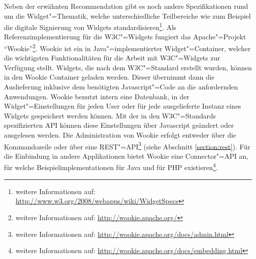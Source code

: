 Neben der erwähnten Recommendation gibt es noch andere Spezifikationen rund um die Widget"=Thematik, welche unterschiedliche Teilbereiche wie zum Beispiel die digitale Signierung von Widgets standardisieren\footnote{weitere Informationen auf: \url{http://www.w3.org/2008/webapps/wiki/WidgetSpecs}}. Als Referenzimplementierung für die W3C"=Widgets fungiert das Apache"=Projekt "`Wookie"'\footnote{weitere Informationen auf: \url{http://wookie.apache.org/}}. Wookie ist ein in Java"=implementierter Widget"=Container, welcher die wichtigsten Funktionalitäten für die Arbeit mit \ac{W3C}"=Widgets zur Verfügung stellt. Widgets, die nach dem \ac{W3C}"=Standard erstellt wurden, können in den Wookie Container geladen werden. Dieser übernimmt dann die Auslieferung inklusive dem benötigten Javascript"=Code an die anfordernden Anwendungen. Wookie benutzt intern eine Datenbank, in der Widget"=Einstellungen für jeden User oder für jede ausgelieferte Instanz eines Widgets gespeichert werden können. Mit der in den \ac{W3C}"=Standards spezifizierten \ac{API} können diese Einstellungen über Javascript geändert oder ausgelesen werden. Die Administration von Wookie erfolgt entweder über die Kommandozeile oder über eine REST"=\ac{API}\footnote{weitere Informationen auf: \url{http://wookie.apache.org/docs/admin.html}} (siehe Abschnitt \ref{section:rest}). Für die Einbindung in andere Applikationen bietet Wookie eine Connector"=\ac{API} an, für welche Beispielimplementationen für Java und für PHP existieren\footnote{weitere Informationen auf: \url{http://wookie.apache.org/docs/embedding.html}}.

